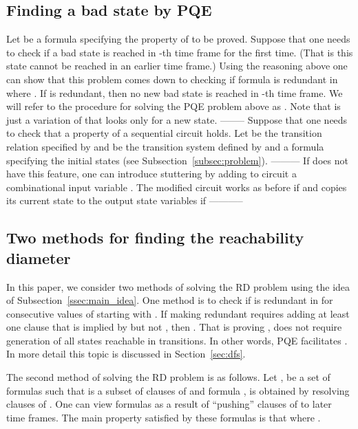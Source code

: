 \subsection{Finding a bad state by PQE}
Let  be a formula specifying the property of \KS to be proved.
Suppose that one needs to check if a bad state is reached in -th
time frame for the first time. (That is this state cannot be reached
in an earlier time frame.) Using the reasoning above one can show that
this problem comes down to checking if formula  is redundant in
 where . If  is redundant, then no
new bad state is reached in -th time frame. We will refer to the
procedure for solving the PQE problem above as \bs. Note that \BS is
just a variation of \CD that looks only for a new  state.
--------
Suppose that one needs to check that a property  of a sequential
circuit  holds. Let  be the transition relation specified by 
and \KS be the transition system defined by  and a formula 
specifying the initial states (see Subsection~\ref{subsec:problem}).
---------
If \KS does not have this feature, one can
introduce stuttering by adding to circuit  a combinational input
variable .  The modified circuit  works as before if  and
copies its current state to the output state variables if 
-----------
\subsection{Two methods for finding the reachability diameter}
\label{ssec:two_impl}
In this paper, we consider two methods of solving the RD problem using
the idea of Subsection~\ref{ssec:main_idea}.  One method is to check
if  is redundant in  for consecutive values of  starting with . If
making  redundant requires adding at least one clause
 that is implied by 
but not , then . That is
proving , does not require generation of all states
reachable in  transitions. In other words, PQE facilitates
.  In more detail this topic is discussed in
Section~\ref{sec:dfs}.

The second method of solving the RD problem is as follows. Let
,  be a set of formulas such that  is a
subset of clauses of  and formula ,  is
obtained by resolving clauses of .
One can view formulas  as a result of ``pushing''
clauses of  to later time frames.  The main property satisfied by
these formulas is that  where .

